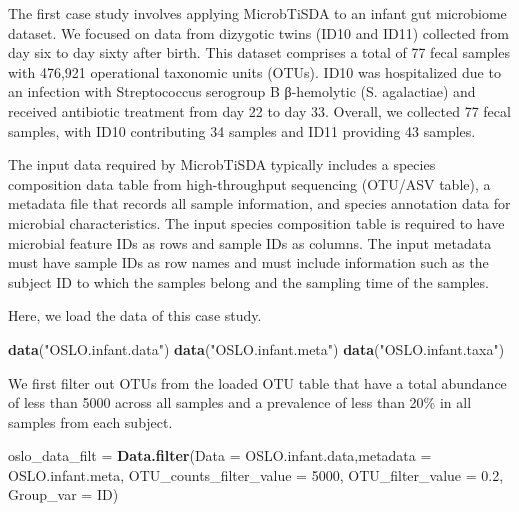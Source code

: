 \documentclass[
]{article}
\newenvironment{Shaded}{\begin{snugshade}}{\end{snugshade}}
\newcommand{\AttributeTok}[1]{\textcolor[rgb]{0.13,0.29,0.53}{#1}}
\newcommand{\DecValTok}[1]{\textcolor[rgb]{0.00,0.00,0.81}{#1}}
\newcommand{\FloatTok}[1]{\textcolor[rgb]{0.00,0.00,0.81}{#1}}
\newcommand{\FunctionTok}[1]{\textcolor[rgb]{0.13,0.29,0.53}{\textbf{#1}}}
\newcommand{\NormalTok}[1]{#1}
\newcommand{\OtherTok}[1]{\textcolor[rgb]{0.56,0.35,0.01}{#1}}
\newcommand{\StringTok}[1]{\textcolor[rgb]{0.31,0.60,0.02}{#1}}
\begin{document}
The first case study involves applying MicrobTiSDA to an infant gut
microbiome dataset. We focused on data from dizygotic twins (ID10 and
ID11) collected from day six to day sixty after birth. This dataset
comprises a total of 77 fecal samples with 476,921 operational taxonomic
units (OTUs). ID10 was hospitalized due to an infection with
Streptococcus serogroup B β-hemolytic (S. agalactiae) and received
antibiotic treatment from day 22 to day 33. Overall, we collected 77
fecal samples, with ID10 contributing 34 samples and ID11 providing 43
samples.

The input data required by MicrobTiSDA typically includes a species
composition data table from high-throughput sequencing (OTU/ASV table),
a metadata file that records all sample information, and species
annotation data for microbial characteristics. The input species
composition table is required to have microbial feature IDs as rows and
sample IDs as columns. The input metadata must have sample IDs as row
names and must include information such as the subject ID to which the
samples belong and the sampling time of the samples.

Here, we load the data of this case study.

\begin{Shaded}
\begin{Highlighting}[]
\FunctionTok{data}\NormalTok{(}\StringTok{"OSLO.infant.data"}\NormalTok{)}
\FunctionTok{data}\NormalTok{(}\StringTok{"OSLO.infant.meta"}\NormalTok{)}
\FunctionTok{data}\NormalTok{(}\StringTok{"OSLO.infant.taxa"}\NormalTok{)}
\end{Highlighting}
\end{Shaded}

We first filter out OTUs from the loaded OTU table that have a total
abundance of less than 5000 across all samples and a prevalence of less
than 20\% in all samples from each subject.

\begin{Shaded}
\begin{Highlighting}[]
\NormalTok{oslo\_data\_filt }\OtherTok{=} \FunctionTok{Data.filter}\NormalTok{(}\AttributeTok{Data =}\NormalTok{ OSLO.infant.data,}\AttributeTok{metadata =}\NormalTok{ OSLO.infant.meta,}
                             \AttributeTok{OTU\_counts\_filter\_value =} \DecValTok{5000}\NormalTok{, }\AttributeTok{OTU\_filter\_value =} \FloatTok{0.2}\NormalTok{,}
                             \AttributeTok{Group\_var =} \StringTok{\textquotesingle{}ID\textquotesingle{}}\NormalTok{)}
\end{Highlighting}
\end{Shaded}
\end{document}
